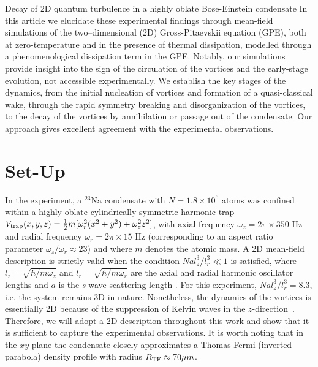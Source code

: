 \begin{chapter}{\label{cha:shin}Decay of 2D quantum turbulence in a highly oblate Bose-Einstein condensate}
 In this article we elucidate these experimental
findings through mean-field simulations of the two--dimensional (2D) Gross-Pitaevskii equation (GPE), both at zero-temperature and in the presence of 
thermal dissipation, modelled through a phenomenological dissipation term in 
the GPE.  Notably, our simulations provide insight into the sign of the circulation of the vortices and the early-stage evolution, not accessible experimentally.  We establish the key stages of the dynamics, from the initial nucleation of vortices and formation of a quasi-classical wake, through the rapid symmetry breaking and disorganization of the vortices, to the decay of the vortices by annihilation or passage out of the condensate.  Our approach gives excellent agreement with the experimental observations.  

\section{Set-Up}
In the experiment, a $^{23}$Na condensate with $N=1.8\times 10^6$ atoms was confined within a highly-oblate cylindrically symmetric harmonic trap $V_{\rm{trap}}(x,y,z)=\frac{1}{2}m[\omega_r^2 (x^2+y^2) +\omega_z^2 z^2 ]$, with axial frequency $\omega_z=2 \pi \times 350$ Hz and radial frequency $\omega_r=2\pi \times 15$ Hz (corresponding to an aspect ratio parameter $\omega_z/\omega_r \approx 23$) and where $m$ denotes the atomic mass.  
A 2D mean-field description is strictly valid when 
the condition $N a l_z^3/l_r^3 \ll 1$ is satisfied, 
where $l_z=\sqrt{\hbar/m \omega_z}$ and $l_r=\sqrt{\hbar/m\omega_r}$ 
are the axial and radial harmonic oscillator lengths and $a$ is 
the {\it s}-wave scattering length \cite{delgado,parker2008}.  
For this experiment, $N a l_z^3/l_r^3=8.3$, i.e. the system remains 
3D in nature.   Nonetheless, the dynamics of the vortices is essentially 2D 
because of the suppression of Kelvin waves in 
the $z$-direction~\citep{jackson_proukakis_09}.  
Therefore, we will adopt a 2D description throughout this work and 
show that it is sufficient to capture the experimental observations.  
It is worth noting that in the $xy$ plane the condensate 
closely approximates a Thomas-Fermi (inverted parabola) density 
profile with radius $R_{\rm TF}\approx70 \mu m$.


\end{chapter}
